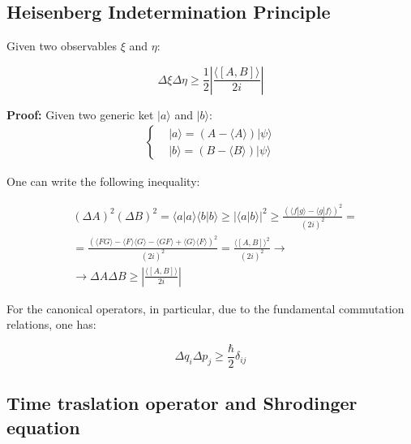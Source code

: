 \documentclass{report}
\begin{document}
\subsection{Heisenberg Indetermination Principle}

\begin{tcolorbox}[colframe=gray!50, colback=gray!10, coltitle=black, title=Heisenberg Indetermination Principle]
  Given two observables $\xi$ and $\eta$:

  \begin{equation}
    \Delta \xi \Delta \eta \geq \frac{1}{2}|\frac{\langle [A,B]\rangle }{2i}|
  \end{equation}

\end{tcolorbox}

\textbf{Proof:}
Given two generic ket $|a\rangle $ and $|b\rangle $:
\begin{align*}
  \left\{
  \begin{aligned}
     & |a\rangle=(A-\langle A\rangle)|\psi\rangle \\
     & |b\rangle=(B-\langle B\rangle)|\psi\rangle
  \end{aligned}
  \right.
\end{align*}

One can write the following inequality:

\begin{align*}
   & (\Delta A)^2(\Delta B)^2=\langle a|a\rangle\langle b|b\rangle \geq |\langle a|b\rangle |^2 \geq \frac{(\langle f|g\rangle -\langle g|f\rangle )^2}{(2i)^2}=                        \\
   & =\frac{(\langle FG\rangle -\langle F\rangle \langle G\rangle -\langle GF\rangle +\langle G\rangle \langle F\rangle )^2}{(2i)^2}=\frac{\langle [A,B]\rangle ^2}{(2i)^2} \rightarrow \\
   & \rightarrow \Delta A \Delta B \geq |\frac{\langle [A,B]\rangle }{2i}|
\end{align*}

For the canonical operators, in particular, due to the fundamental commutation relations, one has:

\begin{equation}
  \Delta q_i \Delta p_j\geq \frac{\hbar}{2}\delta_{ij}
\end{equation}

\subsection{Time traslation operator and Shrodinger equation}
\end{document}

